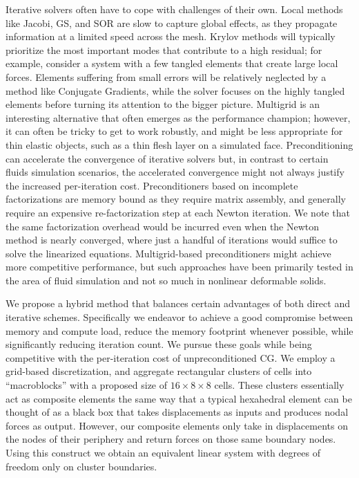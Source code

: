  Iterative solvers often have to cope with challenges of their
 own. Local methods like Jacobi, GS, and SOR are slow to capture
 global effects, as they propagate information at a limited speed
 across the mesh. Krylov methods will typically prioritize the most
 important modes that contribute to a high residual; for example,
 consider a system with a few tangled elements that create large local
 forces.  Elements suffering from small errors will be relatively
 neglected by a method like Conjugate Gradients, while the solver
 focuses on the highly tangled elements before turning its attention
 to the bigger picture. Multigrid is an interesting alternative that
 often emerges as the performance champion; however, it can often be
 tricky to get to work robustly, and might be less appropriate for
 thin elastic objects, such as a thin flesh layer on a simulated
 face. Preconditioning can accelerate the convergence of iterative
 solvers but, in contrast to certain fluids simulation scenarios, the
 accelerated convergence might not always justify the increased
 per-iteration cost. Preconditioners based on incomplete
 factorizations are memory bound as they require matrix assembly, and
 generally require an expensive re-factorization step at each Newton
 iteration. We note that the same factorization overhead would be
 incurred even when the Newton method is nearly converged, where just
 a handful of iterations would suffice to solve the linearized
 equations. Multigrid-based preconditioners might achieve more
 competitive performance, but such approaches have been primarily
 tested in the area of fluid simulation \cite{FerstWD:2014} and not so
 much in nonlinear deformable solids.

 We propose a hybrid method that balances certain advantages of both
 direct and iterative schemes. Specifically we endeavor to achieve a
 good compromise between memory and compute load, reduce the memory
 footprint whenever possible, while significantly reducing iteration
 count. We pursue these goals while being competitive with the
 per-iteration cost of unpreconditioned CG. We employ a grid-based
 discretization, and aggregate rectangular clusters of cells into
 ``macroblocks'' with a proposed size of $16\times 8\times 8$ cells.
 These clusters essentially act as composite elements the same way
 that a typical hexahedral element can be thought of as a black box
 that takes displacements as inputs and produces nodal forces as
 output. However, our composite elements only take in displacements on
 the nodes of their periphery and return forces on those same boundary
 nodes. Using this construct we obtain an equivalent linear system
 with degrees of freedom only on cluster boundaries.

